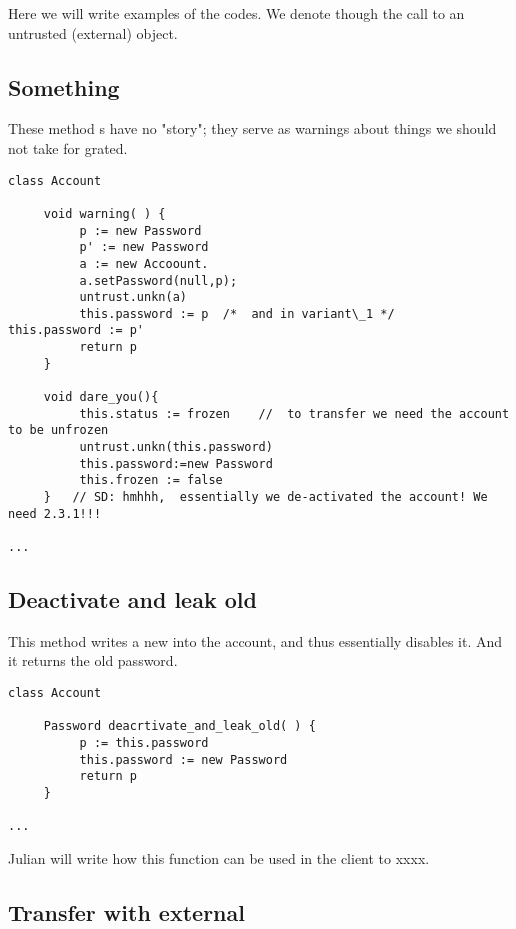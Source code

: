 
Here we will write examples of the codes. We denote though  the call to an untrusted (external) object.


\subsection{Something}

These  method s have no "story"; they serve  as warnings about things we should not take for grated.

\begin{lstlisting}[language=chainmail, mathescape=true, frame=lines]
class Account

     void warning( ) {
          p := new Password
          p' := new Password
          a := new Accoount.
          a.setPassword(null,p);
          untrust.unkn(a)
          this.password := p  /*  and in variant\_1 */     this.password := p' 
          return p    
     }
     
     void dare_you(){
          this.status := frozen    //  to transfer we need the account to be unfrozen 
          untrust.unkn(this.password)
          this.password:=new Password
          this.frozen := false
     }   // SD: hmhhh,  essentially we de-activated the account! We need 2.3.1!!!
     
...
\end{lstlisting}


\subsection*{Deactivate and leak old}

This method writes a new  into the account, and thus essentially disables it. And it returns the old password.

\begin{lstlisting}[language=chainmail, mathescape=true, frame=lines]
class Account

     Password deacrtivate_and_leak_old( ) {
          p := this.password
          this.password := new Password
          return p    
     }
     
...
\end{lstlisting}

Julian will write how this function can be used in the client to xxxx.

\subsection{Transfer with external}

